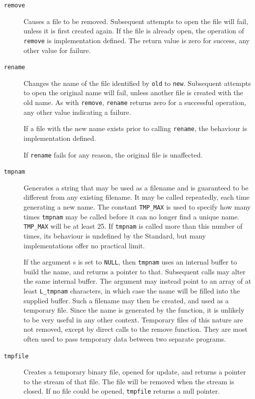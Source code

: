    \begin{description}
    \item[\texttt{remove}] Causes a file to be removed. Subsequent attempts to  open
     the file will fail, unless it is first created again.  If
     the file is already open,  the  operation  of  \texttt{remove}  is
     implementation  defined.  The  return  value  is zero for
     success, any other value for failure.

    \item[\texttt{rename}] 
     Changes the name of the file identified by  \texttt{old}  to
      \texttt{new}.
      Subsequent  attempts to open the original name will fail,
      unless another file is created with  the  old  name.   As
      with \texttt{remove}, \texttt{rename} returns zero for a
      successful operation, any other value indicating a failure.


     If a file with the  new  name  exists  prior  to  calling
      \texttt{rename}, the behaviour is implementation defined.


     If \texttt{rename} fails for any  reason,  the  original  file  is
      unaffected.

    

    \item[\texttt{tmpnam}] 
     Generates a string that may be used as a filename and  is
      guaranteed  to  be  different from any existing filename.
      It may be called repeatedly, each time generating  a  new
      name.  The  constant  \texttt{TMP\_MAX} is used to specify how many
      times \texttt{tmpnam} may be called before it can no longer find a
      unique  name.  \texttt{TMP\_MAX} will be at least 25.  If
      \texttt{tmpnam} is
      called more than this number of times, its  behaviour  is
      undefined by the Standard, but many implementations offer
      no practical limit.


     If the argument s is set to \texttt{NULL},  then
      \texttt{tmpnam}  uses  an
      internal  buffer to build the name, and returns a pointer
      to that. Subsequent calls may  alter  the  same  internal
      buffer.  The argument may instead point to an array of at
      least \texttt{L\_tmpnam} characters, in which case the name will be
      filled  into  the  supplied  buffer.  Such a filename may
      then be created, and used as a temporary file. Since  the
      name  is  generated by the function, it is unlikely to be
      very useful in any other context. Temporary files of this
      nature  are  not  removed,  except by direct calls to the
      remove  function.  They  are  most  often  used  to  pass
      temporary data between two separate programs.

    

    \item[\texttt{tmpfile}] Creates a temporary binary file, opened for  update,  and
     returns  a  pointer to the stream of that file.  The file
     will be removed when the stream is closed.   If  no  file
     could be opened, \texttt{tmpfile} returns a null pointer.
   \end{description}

